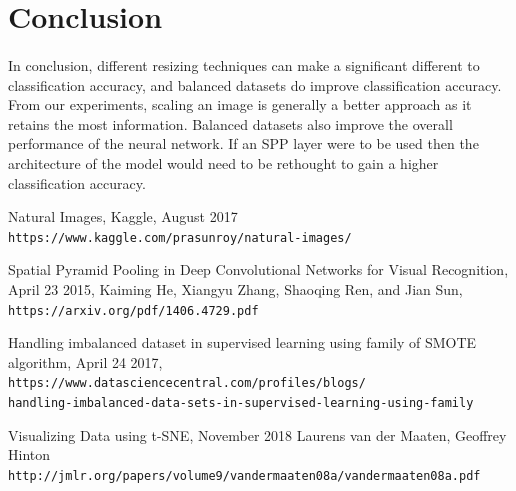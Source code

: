 \documentclass{article}
\begin{document}
\section{Conclusion	}
\paragraph{}
In conclusion, different resizing techniques can make a significant different to classification accuracy, and balanced datasets do improve classification accuracy. From our experiments, scaling an image is generally a better approach as it retains the most information. Balanced datasets also improve the overall performance of the neural network. If an SPP layer were to be used then the architecture of the model would need to be rethought to gain a higher classification accuracy. 

\begin{thebibliography}{9}
Natural Images, Kaggle, August 2017
\\\texttt{https://www.kaggle.com/prasunroy/natural-images/}
 
Spatial Pyramid Pooling in Deep Convolutional Networks for Visual Recognition, April 23 2015,
Kaiming He, Xiangyu Zhang, Shaoqing Ren, and Jian Sun,
\\\texttt{https://arxiv.org/pdf/1406.4729.pdf}

Handling imbalanced dataset in supervised learning using family of SMOTE algorithm, April 24 2017,
\\\texttt{https://www.datasciencecentral.com/profiles/blogs/\\
handling-imbalanced-data-sets-in-supervised-learning-using-family}

Visualizing Data using t-SNE, November 2018
Laurens van der Maaten, Geoffrey Hinton 
\\\texttt{http://jmlr.org/papers/volume9/vandermaaten08a/vandermaaten08a.pdf}

\end{thebibliography}
\end{document}
